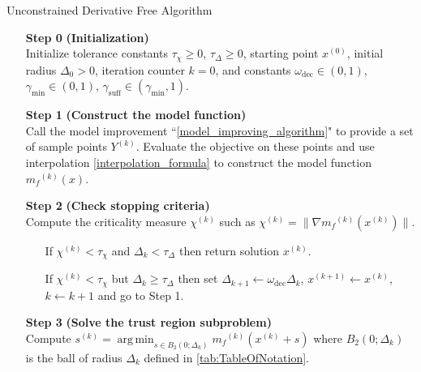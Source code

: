 \documentclass{article}
\theoremstyle{case}
\numberwithin{theorem}{subsection}
\DeclareMathOperator*{\argmin}{arg\,min}
\newcommand{\chik}{{\chi^{(k)}}}
\newcommand{\gammabi}{\gamma_{\textrm{suff}}}
\newcommand{\gammasm}{\gamma_{\textrm{min}}}
\newcommand{\mfk}{{{m}_f}^{(k)}}
\newcommand{\omegadec}{\omega_{\text{dec}}}
\newcommand{\sk}{{{s}^{(k)}}}
\newcommand{\xk}{x^{(k)}}
\newcommand{\xinit}{{x^{(0)}}}
\begin{document}
\begin{algorithm}[H]
    \caption{Unconstrained Derivative Free Algorithm}
    \label{unconstrained_dfo}
    \begin{itemize}
        \item[\textbf{Step 0}] \textbf{(Initialization)} \\
            Initialize tolerance constants $\tau_{\chi} \ge 0$, $\tau_{\Delta} \ge 0$, starting point $\xinit$, initial radius $\Delta_0 > 0$, iteration counter $k=0$, and constants $\omegadec \in (0, 1)$, $ \gammasm \in (0, 1)$, $\gammabi \in (\gammasm, 1)$.
            
        \item[\textbf{Step 1}] \textbf{(Construct the model function)} \\
            Call the model improvement ``\cref{model_improving_algorithm}" to provide a set of sample points $Y^{(k)}$.
            Evaluate the objective on these points and use interpolation \cref{interpolation_formula} to construct the model function $\mfk(x)$.
        
        \item[\textbf{Step 2}] \textbf{(Check stopping criteria)} \\
            Compute the criticality measure $\chik$ such as $\chik = \|\nabla\mfk(\xk)\|$. \begin{itemize}
                \item[] If $ \chik < \tau_{\chi} $ and $\Delta_k<\tau_{\Delta}$ then return solution $\xk$.
                \item[] If $ \chik < \tau_{\chi} $ but $\Delta_k\ge\tau_{\Delta}$ then  
                set $\Delta_{k+1} \gets \omegadec\Delta_{k}$, 
                $x^{(k+1)} \gets \xk$,
                $k \gets k+1$ and go to Step 1.
            \end{itemize}
        
        \item[\textbf{Step 3}] \textbf{(Solve the trust region subproblem)} \\
            Compute $\sk = \argmin_{s\in B_2(0; \Delta_k)} \mfk (\xk + s)$ where $B_2(0; \Delta_k)$ is the ball of radius $\Delta_k$ defined in \cref{tab:TableOfNotation}.
            

\end{itemize}
\end{algorithm}
\end{document}
